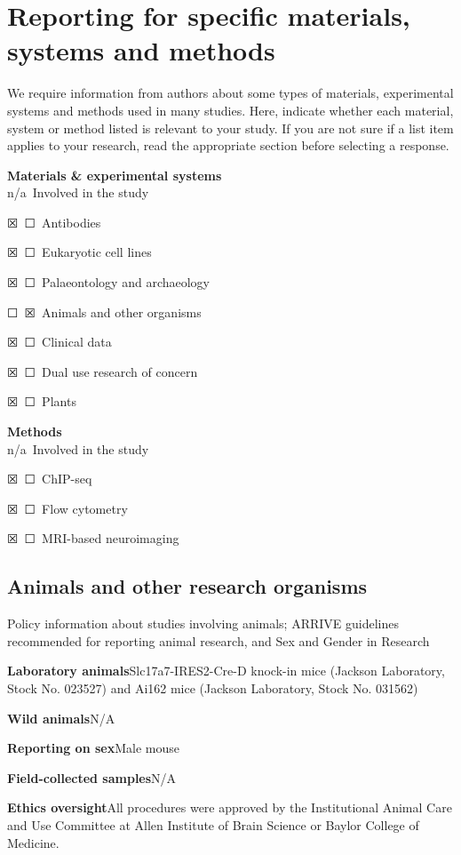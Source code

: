 \documentclass{article}
\newcommand{\yes}{\textsf{☒}}
\newcommand{\no}{\textsf{☐}}
\begin{document}
\section*{Reporting for specific materials, systems and methods}

We require information from authors about some types of materials, experimental systems and methods used in many studies. Here, indicate whether each material, system or method listed is relevant to your study. If you are not sure if a list item applies to your research, read the appropriate section before selecting a response.

\noindent\textbf{Materials \& experimental systems}\\
n/a\ Involved in the study

\begin{hangpars}
\yes\ \no\ Antibodies

\yes\ \no\ Eukaryotic cell lines

\yes\ \no\ Palaeontology and archaeology

\no\ \yes\ Animals and other organisms

\yes\ \no\ Clinical data

\yes\ \no\ Dual use research of concern

\yes\ \no\ Plants
\end{hangpars}

\noindent\textbf{Methods}\\
n/a\ Involved in the study

\begin{hangpars}
\yes\ \no\ ChIP-seq

\yes\ \no\ Flow cytometry

\yes\ \no\ MRI-based neuroimaging
\end{hangpars}

\subsection*{Animals and other research organisms}

Policy information about studies involving animals; ARRIVE guidelines recommended for reporting animal research, and Sex and Gender in Research

\begin{hangpars}
\textbf{Laboratory animals}\quad Slc17a7-IRES2-Cre-D knock-in mice (Jackson Laboratory, Stock No. 023527) and Ai162 mice (Jackson Laboratory, Stock No. 031562)

\textbf{Wild animals}\quad N/A

\textbf{Reporting on sex}\quad Male mouse

\textbf{Field-collected samples}\quad N/A

\textbf{Ethics oversight}\quad All procedures were approved by the Institutional Animal Care and Use Committee at Allen Institute of Brain Science or Baylor College of Medicine.
\end{hangpars}
\end{document}
